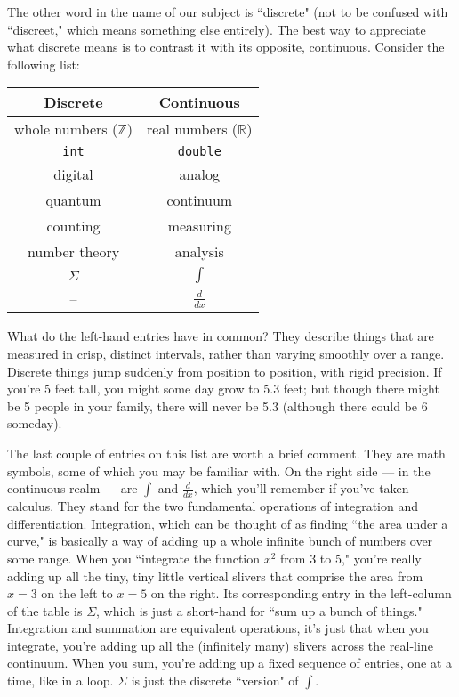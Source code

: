 The other word in the name of our subject is ``discrete" (not to be
confused with ``discreet," which means something else entirely). The best
way to appreciate what discrete means is to contrast it with its opposite,
continuous. Consider the following list:

\begin{center}
\begin{tabular}{c c}
Discrete & Continuous \\
\hline
whole numbers ($\mathbb{Z}$) & real numbers ($\mathbb{R}$) \\
\texttt{int} & \texttt{double} \\
digital & analog \\
quantum & continuum \\
counting & measuring \\
number theory & analysis \\
$\Sigma$ & $\int$ \\
-- & $\frac{d}{dx}$ \\
\end{tabular}
\end{center}

What do the left-hand entries have in common? They describe things that are
measured in crisp, distinct intervals, rather than varying smoothly over a
range. Discrete things jump suddenly from position to position, with rigid
precision.  If you're 5 feet tall, you might some day grow to 5.3 feet; but
though there might be 5 people in your family, there will never be 5.3
(although there could be 6 someday).

The last couple of entries on this list are worth a brief comment. They are
math symbols, some of which you may be familiar with. On the right side ---
in the continuous realm --- are $\int$ and $\frac{d}{dx}$, which you'll
remember if you've taken calculus. They stand for the two fundamental
operations of integration and differentiation. Integration, which can be
thought of as finding ``the area under a curve," is basically a way of
adding up a whole infinite bunch of numbers over some range. When you
``integrate the function $x^2$ from 3 to 5," you're really adding up all
the tiny, tiny little vertical slivers that comprise the area from $x=3$ on
the left to $x=5$ on the right. Its corresponding entry in the left-column
of the table is $\Sigma$, which is just a short-hand for ``sum up a bunch
of things." Integration and summation are equivalent operations, it's just
that when you integrate, you're adding up all the (infinitely many) slivers
across the real-line continuum. When you sum, you're adding up a fixed
sequence of entries, one at a time, like in a loop. $\Sigma$ is just the
discrete ``version" of $\int$. 

